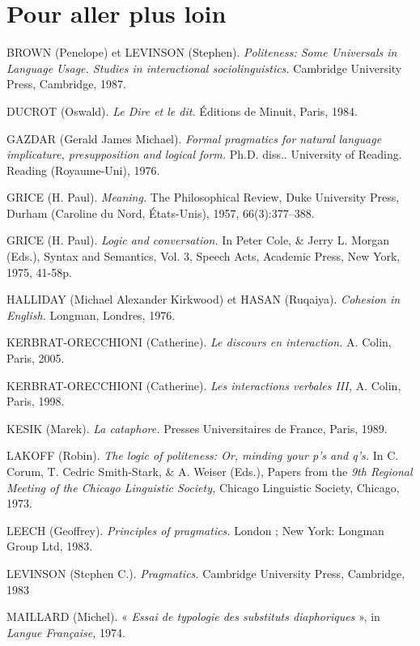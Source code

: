 \section*{Pour aller plus loin}
\begingroup\small{}
\begin{list}{}{\setlength{\leftmargin}{4mm}\setlength{\itemindent}{-4mm}\setlength{\itemsep}{5pt}}
\item BROWN (Penelope) et LEVINSON (Stephen). \textit{Politeness: Some Universals in Language Usage. Studies in interactional sociolinguistics.} Cambridge University Press, Cambridge, 1987.
\item DUCROT (Oswald). \textit{Le Dire et le dit.} Éditions de Minuit, Paris, 1984.
\item GAZDAR (Gerald James Michael). \textit{Formal pragmatics for natural language implicature, presupposition and logical form.} Ph.D. diss.. University of Reading. Reading (Royaume-Uni), 1976.
\item GRICE (H. Paul). \textit{Meaning.} The Philosophical Review, Duke University Press, Durham (Caroline du Nord, États-Unis), 1957, 66(3):377–388.
\item GRICE (H. Paul). \textit{Logic and conversation.} In Peter Cole, \& Jerry L. Morgan (Eds.), Syntax and Semantics, Vol. 3, Speech Acts, Academic Press, New York, 1975, 41-58p.
\item HALLIDAY (Michael Alexander Kirkwood) et HASAN (Ruqaiya). \textit{Cohesion in English.} Longman, Londres, 1976.
\item KERBRAT-ORECCHIONI (Catherine). \textit{Le discours en interaction.} A. Colin, Paris, 2005.
\item KERBRAT-ORECCHIONI (Catherine). \textit{Les interactions verbales III,} A. Colin, Paris, 1998.
\item KESIK (Marek). \textit{La cataphore.} Presses Universitaires de France, Paris, 1989.
\item LAKOFF (Robin). \textit{The logic of politeness: Or, minding your p’s and q’s.} In C. Corum, T. Cedric Smith-Stark, \& A. Weiser (Eds.), Papers from the \textit{9th Regional Meeting of the Chicago Linguistic Society,} Chicago Linguistic Society, Chicago, 1973.
\item LEECH (Geoffrey). \textit{Principles of pragmatics.} London ; New York: Longman Group Ltd, 1983.
\item LEVINSON (Stephen C.). \textit{Pragmatics.} Cambridge University Press, Cambridge, 1983
\item MAILLARD (Michel). « \textit{Essai de typologie des substituts diaphoriques} », in \textit{Langue Française,} 1974.
\end{list}
\endgroup


